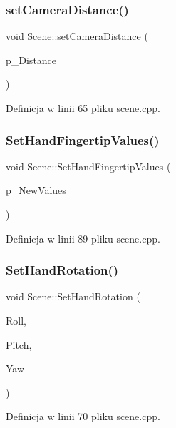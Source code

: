 \subsubsection{\texorpdfstring{set\+Camera\+Distance()}{setCameraDistance()}}
{\footnotesize\ttfamily void Scene\+::set\+Camera\+Distance (\begin{DoxyParamCaption}\item[{float}]{p\+\_\+\+Distance }\end{DoxyParamCaption})}



Definicja w linii 65 pliku scene.\+cpp.

\mbox{\label{class_scene_a4dcd24690f433927c6ca75e9980afd53}} 
\subsubsection{\texorpdfstring{Set\+Hand\+Fingertip\+Values()}{SetHandFingertipValues()}}
{\footnotesize\ttfamily void Scene\+::\+Set\+Hand\+Fingertip\+Values (\begin{DoxyParamCaption}\item[{Q\+Vector$<$ int $>$}]{p\+\_\+\+New\+Values }\end{DoxyParamCaption})}



Definicja w linii 89 pliku scene.\+cpp.

\mbox{\label{class_scene_a85cdeb1563e84f148579f834808aa527}} 
\subsubsection{\texorpdfstring{Set\+Hand\+Rotation()}{SetHandRotation()}}
{\footnotesize\ttfamily void Scene\+::\+Set\+Hand\+Rotation (\begin{DoxyParamCaption}\item[{float}]{Roll,  }\item[{float}]{Pitch,  }\item[{float}]{Yaw }\end{DoxyParamCaption})}



Definicja w linii 70 pliku scene.\+cpp.

